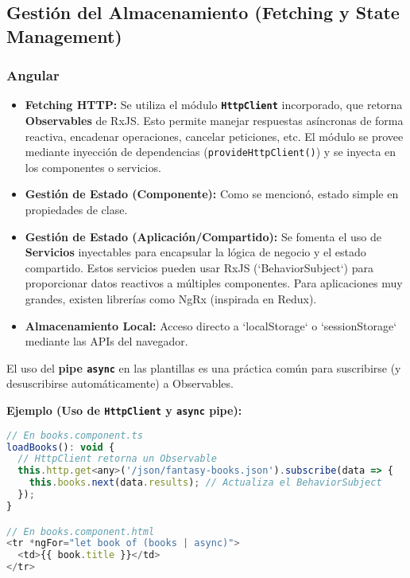 \documentclass[11pt, a4paper]{article}
\begin{document}
\subsection{Gestión del Almacenamiento (Fetching y State Management)}

\subsubsection{Angular}
\begin{itemize}
    \item \textbf{Fetching HTTP:} Se utiliza el módulo \textbf{\texttt{HttpClient}} incorporado, que retorna \textbf{Observables} de RxJS. Esto permite manejar respuestas asíncronas de forma reactiva, encadenar operaciones, cancelar peticiones, etc. El módulo se provee mediante inyección de dependencias (\texttt{provideHttpClient()}) y se inyecta en los componentes o servicios.
    \item \textbf{Gestión de Estado (Componente):} Como se mencionó, estado simple en propiedades de clase.
    \item \textbf{Gestión de Estado (Aplicación/Compartido):} Se fomenta el uso de \textbf{Servicios} inyectables para encapsular la lógica de negocio y el estado compartido. Estos servicios pueden usar RxJS (`BehaviorSubject`) para proporcionar datos reactivos a múltiples componentes. Para aplicaciones muy grandes, existen librerías como NgRx (inspirada en Redux).
    \item \textbf{Almacenamiento Local:} Acceso directo a `localStorage` o `sessionStorage` mediante las APIs del navegador.
\end{itemize}
El uso del \textbf{pipe \texttt{async}} en las plantillas es una práctica común para suscribirse (y desuscribirse automáticamente) a Observables.

\textbf{Ejemplo (Uso de \texttt{HttpClient} y \texttt{async} pipe):}
\begin{lstlisting}[language=JavaScript]
// En books.component.ts
loadBooks(): void {
  // HttpClient retorna un Observable
  this.http.get<any>('/json/fantasy-books.json').subscribe(data => {
    this.books.next(data.results); // Actualiza el BehaviorSubject
  });
}

// En books.component.html
<tr *ngFor="let book of (books | async)">
  <td>{{ book.title }}</td>
</tr>
\end{lstlisting}
\end{document}
